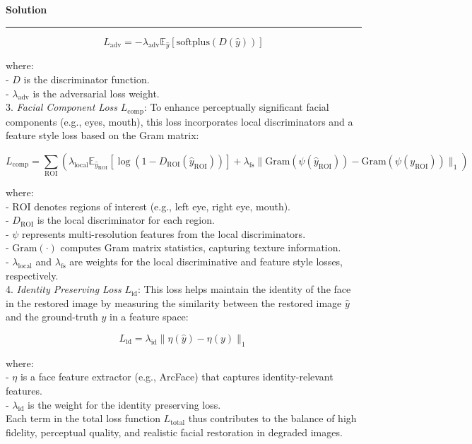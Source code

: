 \documentclass[a4paper,12pt]{article}
\newenvironment{solution}[2][]{%
    \begin{mdframed}[linecolor=blue!70!black, linewidth=2pt, roundcorner=10pt, backgroundcolor=yellow!10!white, skipabove=12pt, skipbelow=12pt]%
        \textbf{\large #2}
        \par\noindent\rule{\textwidth}{0.4pt}
}{
    \end{mdframed}
}
\begin{document}
\begin{solution}{Solution}
   \[
   L_{\text{adv}} = -\lambda_{\text{adv}} \mathbb{E}_{\hat{y}} \left[ \text{softplus}(D(\hat{y})) \right]
   \]

   where:\\
   - \( D \) is the discriminator function.\\
   - \( \lambda_{\text{adv}} \) is the adversarial loss weight.\\

3. \textit{Facial Component Loss} \( L_{\text{comp}} \): To enhance perceptually significant facial components (e.g., eyes, mouth), this loss incorporates local discriminators and a feature style loss based on the Gram matrix:

   \[
   L_{\text{comp}} = \sum_{\text{ROI}} \left( \lambda_{\text{local}} \mathbb{E}_{\hat{y}_{\text{ROI}}} \left[ \log (1 - D_{\text{ROI}}(\hat{y}_{\text{ROI}})) \right] + \lambda_{\text{fs}} \| \text{Gram}(\psi(\hat{y}_{\text{ROI}})) - \text{Gram}(\psi(y_{\text{ROI}})) \|_1 \right)
   \]

   where: \\
   - \( \text{ROI} \) denotes regions of interest (e.g., left eye, right eye, mouth). \\
   - \( D_{\text{ROI}} \) is the local discriminator for each region.\\
   - \( \psi \) represents multi-resolution features from the local discriminators.\\
   - \( \text{Gram}(\cdot) \) computes Gram matrix statistics, capturing texture information.\\
   - \( \lambda_{\text{local}} \) and \( \lambda_{\text{fs}} \) are weights for the local discriminative and feature style losses, respectively.\\

4. \textit{Identity Preserving Loss} \( L_{\text{id}} \): This loss helps maintain the identity of the face in the restored image by measuring the similarity between the restored image \( \hat{y} \) and the ground-truth \( y \) in a feature space:

   \[
   L_{\text{id}} = \lambda_{\text{id}} \| \eta(\hat{y}) - \eta(y) \|_1
   \]

   where:\\
   - \( \eta \) is a face feature extractor (e.g., ArcFace) that captures identity-relevant features.\\
   - \( \lambda_{\text{id}} \) is the weight for the identity preserving loss.\\

Each term in the total loss function \( L_{\text{total}} \) thus contributes to the balance of high fidelity, perceptual quality, and realistic facial restoration in degraded images.
\end{solution}
\end{document}
